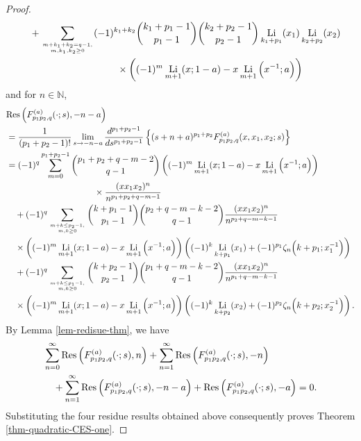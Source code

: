 \documentclass[11pt]{article}
\newcommand\Res{{\rm Res}}
\DeclareMathOperator{\Li}{Li}
\def\N{\mathbb{N}}
\theoremstyle{plain}
\theoremstyle{definition}
\begin{document}
\begin{proof}
\begin{align*}
&\quad+\sum_{m+k_1+k_2=q-1,\atop m,k_1,k_2\geq 0}(-1)^{k_1+k_2}\binom{k_1+p_1-1}{p_1-1}\binom{k_2+p_2-1}{p_2-1}\Li_{k_1+p_1}(x_1)\Li_{k_2+p_2}(x_2)\nonumber\\&\qquad\qquad\qquad\qquad\qquad\times \left((-1)^m\Li_{m+1}(x;1-a)-x \Li_{m+1}\Big(x^{-1};a\Big)\right)
\end{align*}
and for $n\in\N$,
\begin{align*}
&\Res\left(F^{(a)}_{p_1p_2,q}(\cdot;s),-n-a\right)\\&=\frac{1}{(p_1+p_2-1)!}\lim_{s\rightarrow -n-a}\frac{d^{p_1+p_2-1}}{ds^{p_1+p_2-1}}\left\{(s+n+a)^{p_1+p_2}F_{p_1p_2,q}^{(a)}(x,x_1,x_2;s)\right\}\\
&=(-1)^q\sum_{m=0}^{p_1+p_2-1}\binom{p_1+p_2+q-m-2}{q-1}\left((-1)^m\Li_{m+1}(x;1-a)-x \Li_{m+1}\Big(x^{-1};a\Big)\right)\\&\qquad\qquad\qquad\qquad\qquad\times \frac{(xx_1x_2)^n}{n^{p_1+p_2+q-m-1}}\\
&\quad+(-1)^q \sum_{m+k\leq p_2-1,\atop m,k\geq 0} \binom{k+p_1-1}{p_1-1}\binom{p_2+q-m-k-2}{q-1}\frac{(xx_1x_2)^n}{n^{p_2+q-m-k-1}} \nonumber\\&\quad\times\left((-1)^m\Li_{m+1}(x;1-a)-x \Li_{m+1}\Big(x^{-1};a\Big)\right)\left((-1)^k\Li_{k+p_1}(x_1)+(-1)^{p_1}\zeta_n\Big(k+p_1;x_1^{-1}\Big)\right)\\
&\quad+(-1)^q \sum_{m+k\leq p_1-1,\atop m,k\geq 0} \binom{k+p_2-1}{p_2-1}\binom{p_1+q-m-k-2}{q-1}\frac{(xx_1x_2)^n}{n^{p_1+q-m-k-1}} \nonumber\\&\quad\times\left((-1)^m\Li_{m+1}(x;1-a)-x \Li_{m+1}\Big(x^{-1};a\Big)\right)\left((-1)^k\Li_{k+p_2}(x_2)+(-1)^{p_2}\zeta_n\Big(k+p_2;x_2^{-1}\Big)\right).
\end{align*}
By Lemma \ref{lem-redisue-thm}, we have
\begin{align*}
&\sum_{n=0}^\infty \Res\left(F^{(a)}_{p_1p_2,q}(\cdot;s),n\right)+\sum_{n=1}^\infty \Res\left(F^{(a)}_{p_1p_2,q}(\cdot;s),-n\right)\\&\quad+\sum_{n=1}^\infty\Res\left(F^{(a)}_{p_1p_2,q}(\cdot;s),-n-a\right)+\Res\left(F^{(a)}_{p_1p_2,q}(\cdot;s),-a\right)=0.
\end{align*}
Substituting the four residue results obtained above consequently proves Theorem \ref{thm-quadratic-CES-one}.
\end{proof}
\end{document}
